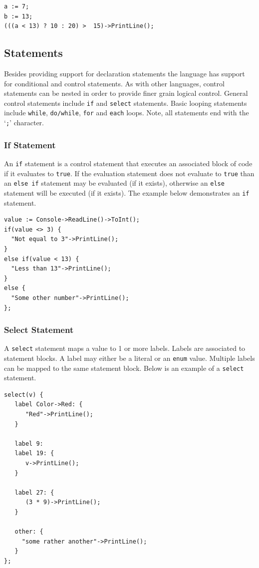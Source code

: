 \documentclass[11pt]{article}
\begin{document}
\begin{verbatim}
a := 7;
b := 13;
(((a < 13) ? 10 : 20) >  15)->PrintLine();
\end{verbatim}

\subsection{Statements}
Besides providing support for declaration statements the language has
support for conditional and control statements.  As with other
languages, control statements can be nested in order to provide finer
grain logical control. General control statements include \texttt{if}
and \texttt{select} statements. Basic looping statements include
\texttt{while}, \texttt{do/while}, \texttt{for} and \texttt{each}
loops.  Note, all statements end with the `\texttt{;}' character.

\subsubsection{If Statement}

An \texttt{if} statement is a control statement that executes an
associated block of code if it evaluates to \texttt{true}.  If the
evaluation statement does not evaluate to \texttt{true} than an
\texttt{else if} statement may be evaluated (if it exists), otherwise
an \texttt{else} statement will be executed (if it exists).  The
example below demonstrates an \texttt{if} statement.

\begin{verbatim}
value := Console->ReadLine()->ToInt();
if(value <> 3) {
  "Not equal to 3"->PrintLine();
}
else if(value < 13) {
  "Less than 13"->PrintLine();
}
else {
  "Some other number"->PrintLine();
};
\end{verbatim}

\subsubsection{Select Statement}

A \texttt{select} statement maps a value to 1 or more labels.  Labels
are associated to statement blocks.  A label may either be a literal
or an \texttt{enum} value.  Multiple labels can be mapped to the same
statement block.  Below is an example of a \texttt{select} statement.

\begin{verbatim}
select(v) {
   label Color->Red: {
      "Red"->PrintLine();
   }

   label 9:
   label 19: {
      v->PrintLine();
   }

   label 27: {
      (3 * 9)->PrintLine();
   }
  
   other: {
     "some rather another"->PrintLine();
   }
};
\end{verbatim}
\end{document}
